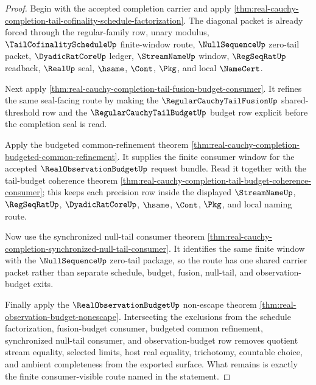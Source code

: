 \begin{proof}
Begin with the accepted completion carrier and apply \autoref{thm:real-cauchy-completion-tail-cofinality-schedule-factorization}. The diagonal packet is already forced through the regular-family row, unary modulus, $\TailCofinalityScheduleUp$ finite-window route, $\NullSequenceUp$ zero-tail packet, $\DyadicRatCoreUp$ ledger, $\StreamNameUp$ window, $\RegSeqRatUp$ readback, $\RealUp$ seal, $\hsame$, $\Cont$, $\Pkg$, and local $\NameCert$.

Next apply \autoref{thm:real-cauchy-completion-tail-fusion-budget-consumer}. It refines the same seal-facing route by making the $\RegularCauchyTailFusionUp$ shared-threshold row and the $\RegularCauchyTailBudgetUp$ budget row explicit before the completion seal is read.

Apply the budgeted common-refinement theorem \autoref{thm:real-cauchy-completion-budgeted-common-refinement}. It supplies the finite consumer window for the accepted $\RealObservationBudgetUp$ request bundle. Read it together with the tail-budget coherence theorem \autoref{thm:real-cauchy-completion-tail-budget-coherence-consumer}; this keeps each precision row inside the displayed $\StreamNameUp$, $\RegSeqRatUp$, $\DyadicRatCoreUp$, $\hsame$, $\Cont$, $\Pkg$, and local naming route.

Now use the synchronized null-tail consumer theorem \autoref{thm:real-cauchy-completion-synchronized-null-tail-consumer}. It identifies the same finite window with the $\NullSequenceUp$ zero-tail package, so the route has one shared carrier packet rather than separate schedule, budget, fusion, null-tail, and observation-budget exits.

Finally apply the $\RealObservationBudgetUp$ non-escape theorem \autoref{thm:real-observation-budget-nonescape}. Intersecting the exclusions from the schedule factorization, fusion-budget consumer, budgeted common refinement, synchronized null-tail consumer, and observation-budget row removes quotient stream equality, selected limits, host real equality, trichotomy, countable choice, and ambient completeness from the exported surface. What remains is exactly the finite consumer-visible route named in the statement.
\end{proof}

